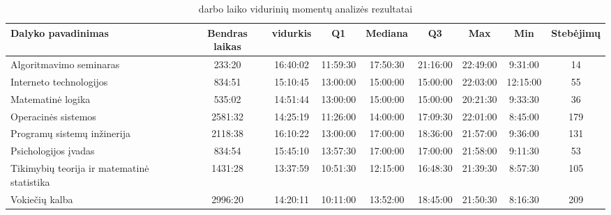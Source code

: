 \begin{sidewaystable}
\centering
\begin{tabular}{|l|c|c|c|c|c|c|c|c|}
  \hline
  {\bf Dalyko pavadinimas} & {\bf Bendras laikas} & {\bf vidurkis } & {\bf Q1 } & {\bf Mediana} & {\bf Q3} & {\bf Max} & {\bf Min} & {\bf Stebėjimų}  \\
  \hline
  Algoritmavimo seminaras & 233:20 & 16:40:02 & 11:59:30 & 17:50:30 & 21:16:00 & 22:49:00 & 9:31:00 & 14
\\
  \hline
  Interneto technologijos & 834:51 & 15:10:45 & 13:00:00 & 15:00:00 & 15:00:00 & 22:03:00 & 12:15:00 & 55
 \\
  \hline
  Matematinė logika & 535:02 & 14:51:44 & 13:00:00 & 15:00:00 & 15:00:00 & 20:21:30 & 9:33:30 & 36
 \\
  \hline
  Operacinės sistemos & 2581:32 & 14:25:19 & 11:26:00 & 14:00:00 & 17:09:30 & 22:01:00 & 8:45:00 & 179
 \\
  \hline
  Programų sistemų inžinerija & 2118:38 & 16:10:22 & 13:00:00 & 17:00:00 & 18:36:00 & 21:57:00 & 9:36:00 & 131
 \\
  \hline
  Psichologijos įvadas & 834:54 & 15:45:10 & 13:57:30 & 17:00:00 & 17:00:00 & 21:58:00 & 9:11:30 & 53
\\
  \hline
  Tikimybių teorija ir matematinė statistika & 1431:28 & 13:37:59 & 10:51:30 & 12:15:00 & 16:48:30 & 21:39:30 & 8:57:30 & 105 \\
  \hline
  Vokiečių kalba & 2996:20 & 14:20:11 & 10:11:00 & 13:52:00 & 18:45:00 & 21:50:30 & 8:16:30 & 209 \\
  \hline
\end{tabular}
\caption{darbo laiko vidurinių momentų analizės rezultatai}
\end{sidewaystable}


